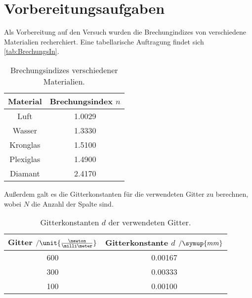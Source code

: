 \section{Vorbereitungsaufgaben}
\label{sec:Vorbereitung}
Als Vorbereitung auf den Versuch wurden die Brechungindizes von verschiedene Materialien recherchiert.
Eine tabellarische Auftragung findet sich \autoref{tab:BrechungsIn}.
\begin{table}
    \centering
    \caption{Brechungsindizes verschiedener Materialien.}
    \begin{tabular}{c c}
        \toprule
        Material & Brechungsindex $n$\\
        \midrule
        Luft & 1.0029\\
        Wasser & 1.3330\\
        Kronglas & 1.5100\\
        Plexiglas & 1.4900\\
        Diamant & 2.4170\\
        \bottomrule
    \end{tabular}
    \label{tab:BrechungsIn}
\end{table}
Außerdem galt es die Gitterkonstanten für die verwendeten Gitter zu berechnen, wobei $N$ die Anzahl der Spalte sind.
\begin{table}
    \centering
    \caption{Gitterkonstanten $d$ der verwendeten Gitter.}
    \begin{tabular}{c c}
        \toprule
        Gitter $\mathbin{/}\unit{\frac{\newton}{\milli \meter}}$& Gitterkonstante $d$ $\mathbin{/} \symup{mm}$\\
        \midrule
        600& 0.00167\\
        300 & 0.00333\\
        100 & 0.00100\\
        \bottomrule
    \end{tabular}
    \label{tab:BrechungsIn}
\end{table}
